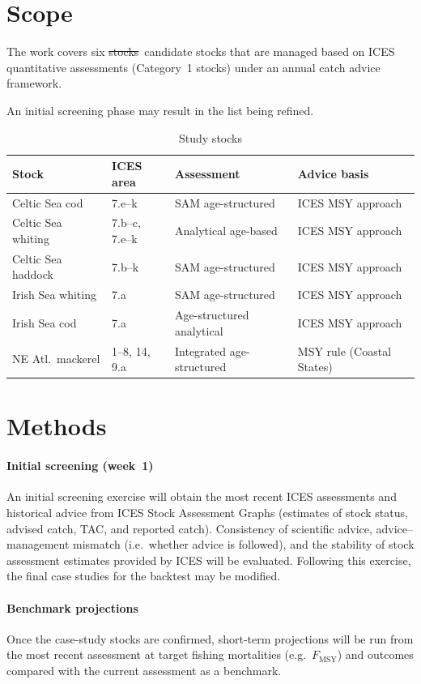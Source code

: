 \documentclass[11pt,a4paper]{extarticle}
\newcommand{\removed}[1]{\sout{#1}}
\newcommand{\addedinline}[1]{\colorbox{yellow!35}{#1}}
\newcommand{\added}[1]{%
	\par\vspace{0.3em}\noindent
	\colorbox{yellow!35}{\parbox{\dimexpr\linewidth-2\fboxsep-2\fboxrule\relax}{#1}}%
	\par\vspace{0.3em}%
}
\newcommand{\replaced}[2]{\removed{#1}\ \addedinline{#2}}
\begin{document}
	\section*{Scope}
	
	The work covers six \replaced{stocks}{candidate stocks} that are managed based on ICES quantitative assessments (Category~1 stocks) under an annual catch advice framework. \added{An initial screening phase may result in the list being refined.}
{\footnotesize	
\begin{table}[h]
	\centering
	\small
	\caption{Study stocks}
	\begin{tabular}{@{}llll@{}}
		\toprule
		Stock & ICES area & Assessment & Advice basis \\
		\midrule
		Celtic Sea cod &
		7.e--k &
		SAM age-structured &
		ICES MSY approach \\
		
		Celtic Sea whiting &
		7.b--c, 7.e--k &
		Analytical age-based &
		ICES MSY approach \\
		
		Celtic Sea haddock &
		7.b--k &
		SAM age-structured &
		ICES MSY approach \\
		
		Irish Sea whiting &
		7.a &
		SAM age-structured &
		ICES MSY approach \\
		
		Irish Sea cod &
		7.a &
		Age-structured analytical &
		ICES MSY approach \\
		
		NE Atl.\ mackerel &
		1--8, 14, 9.a &
		Integrated age-structured &
		MSY rule (Coastal States) \\
		\bottomrule
	\end{tabular}
	\end{table}}
		
	\section*{Methods}
	
	\added{%
	\paragraph{Initial screening (week~1)}
	An initial screening exercise will obtain the most recent ICES assessments and historical advice from ICES Stock Assessment Graphs (estimates of stock status, advised catch, TAC, and reported catch). Consistency of scientific advice, advice--management mismatch (i.e.\ whether advice is followed), and the stability of stock assessment estimates provided by ICES will be evaluated. Following this exercise, the final case studies for the backtest may be modified.
	
	\paragraph{Benchmark projections}
	Once the case-study stocks are confirmed, short-term projections will be run from the most recent assessment at target fishing mortalities (e.g.\ \(F_{\mathrm{MSY}}\)) and outcomes compared with the current assessment as a benchmark.
	}
	
\end{document}
